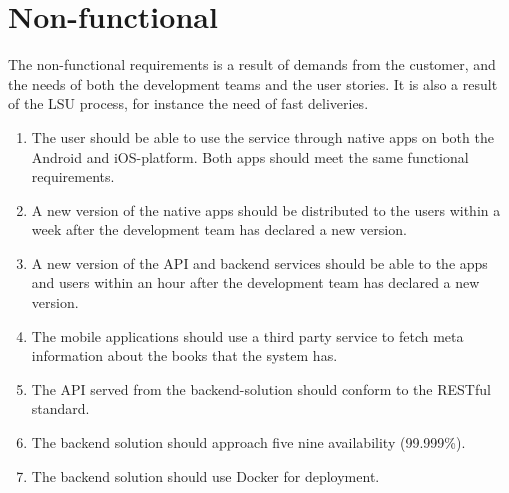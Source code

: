 \section{Non-functional}
The non-functional requirements is a result of demands from the customer, and the needs of both the development teams and the user stories. It is also a result of the \gls{LSU} process, for instance the need of fast deliveries.

\begin{enumerate}[label= {\bf NFR \arabic*}]
    \item The user should be able to use the service through native apps on both the Android and iOS-platform. Both apps should meet the same functional requirements.
    \item A new version of the native apps should be distributed to the users within a week after the development team has declared a new version.
    \item A new version of the \gls{API} and \gls{backend} services should be able to the apps and users within an hour after the development team has declared a new version.
    \item The mobile applications should use a third party service to fetch meta information about the books that the system has. \label{nfr-meta}
    \item The \gls{API} served from the \gls{backend}-solution should conform to the RESTful standard.
    \item The \gls{backend} solution should approach five nine availability (99.999\%).
    \item The \gls{backend} solution should use Docker for deployment.
\end{enumerate}

